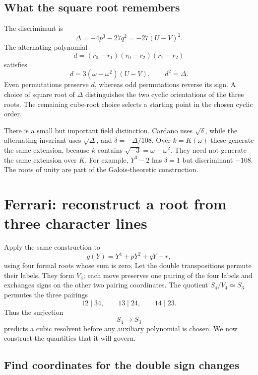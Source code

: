 \documentclass[11pt]{article}
\theoremstyle{remark}
\begin{document}
\subsection{What the square root remembers}

The discriminant is
\[
\Delta=-4p^3-27q^2=-27(U-V)^2.
\]
The alternating polynomial
\[
d=(r_0-r_1)(r_0-r_2)(r_1-r_2)
\]
satisfies
\begin{equation}
d=3(\omega-\omega^2)(U-V),\qquad d^2=\Delta.
\label{eq:cubic-discriminant}
\end{equation}
Even permutations preserve \(d\), whereas odd permutations reverse its sign. A choice of square root of \(\Delta\) distinguishes the two cyclic orientations of the three roots. The remaining cube-root choice selects a starting point in the chosen cyclic order.

There is a small but important field distinction. Cardano uses \(\sqrt\delta\), while the alternating invariant uses \(\sqrt\Delta\), and \(\delta=-\Delta/108\). Over \(k=K(\omega)\) these generate the same extension, because \(k\) contains \(\sqrt{-3}=\omega-\omega^2\). They need not generate the same extension over \(K\). For example, \(Y^3-2\) has \(\delta=1\) but discriminant \(-108\). The roots of unity are part of the Galois-theoretic construction.

\section{Ferrari: reconstruct a root from three character lines}
\label{ferrari:section}

Apply the same construction to
\[
g(Y)=Y^4+pY^2+qY+r,
\]
using four formal roots whose sum is zero. Let the double transpositions permute their labels. They form \(V_4\); each move preserves one pairing of the four labels and exchanges signs on the other two pairing coordinates. The quotient \(S_4/V_4\simeq S_3\) permutes the three pairings
\begin{equation}
12\mid34,\qquad13\mid24,\qquad14\mid23.
\label{eq:pairings}
\end{equation}
Thus the surjection
\begin{equation}
S_4\longrightarrow S_3
\label{eq:quartic-quotient}
\end{equation}
predicts a cubic resolvent before any auxiliary polynomial is chosen. We now construct the quantities that it will govern.

\subsection{Find coordinates for the double sign changes}
\end{document}
